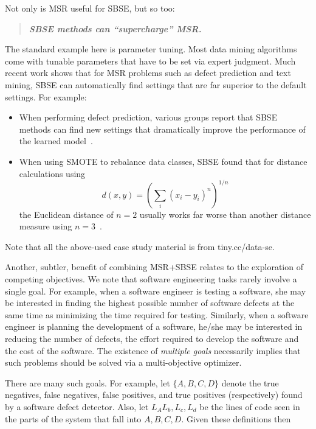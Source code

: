 \documentclass[sigconf]{acmart}
\begin{document}
Not only is   MSR useful for   SBSE, but so too:
\begin{quote}
\centering
{\bf {\em SBSE methods can    ``supercharge''    MSR.}}
\end{quote}
The standard example here is parameter tuning. Most data mining algorithms come with tunable parameters that have to be set via expert judgment. Much recent work shows that for
MSR problems such as defect prediction and text mining, SBSE can automatically find settings that are far superior to the default settings. For example:
\begin{itemize}[leftmargin=*]
 \item
   When performing defect prediction, various groups report that SBSE methods can find new settings that dramatically improve the performance of the learned model~\cite{fu2016tuning,tantithamthavorn2016automated, Tantithamthavorn2018}.

\item When using SMOTE to rebalance data classes, SBSE found that for 
distance calculations using 
  \[d(x,y)=\left(\sum_i(x_i-y_i)^n\right)^{1/n}\] the Euclidean distance of $n=2$ usually works far worse than another distance measure using $n=3$~\cite{agrawal2017better}.
 
\end{itemize} 
Note that all the above-used case study material is from tiny.cc/data-se.

 Another, subtler, benefit of combining MSR+SBSE relates to the exploration of competing
 objectives.
 We note that software engineering tasks rarely involve a single goal. For example, when a software engineer
is testing a software, she may be interested in finding the highest possible number of software defects at the same time as minimizing the time required for testing. Similarly, when a software
engineer is planning the development of a software,
he/she may be interested in reducing the number of
defects, the effort required to develop the software and the cost of the software. The existence of {\em
multiple goals} necessarily implies that such problems should be solved via a multi-objective optimizer.

There are many such goals. For example, 
let $\{A,B,C,D\}$ denote the
true negatives,
false negatives,
false positives, and
true positives
(respectively) found by a software defect detector.
Also, let $L_A L_b, L_c, L_d$ be the lines of code
seen in the parts of the system that fall
into $A, B, C, D$. Given these definitions then
\end{document}
